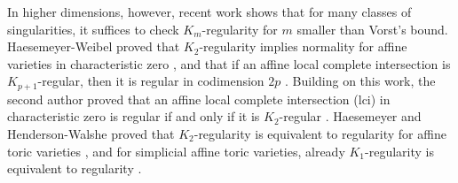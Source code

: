 \documentclass{amsart}
\newtheorem{conjecture}[conjecture]{Conjecture}
\theoremstyle{definition}
\newcommand{\matt}[1]{{\color{red}[[\ensuremath{\spadesuit\spadesuit\spadesuit} #1]]}}
\newcommand{\matt}[1]{}
\begin{document}



In higher dimensions, however, recent work shows that for many classes of singularities, it suffices to check $K_m$-regularity for $m$ smaller than Vorst's bound. Haesemeyer-Weibel proved that $K_2$-regularity implies normality for affine varieties in characteristic zero \cite[Theorem~0.1]{HaesemeyerWeibel}, and that if an affine local complete intersection is $K_{p+1}$-regular, then it is regular in codimension $2p$ \cite[Theorem~0.3]{HaesemeyerWeibel}. Building on this work, the second author proved that an affine local complete intersection (lci) in characteristic zero is regular if and only if it is $K_2$-regular \cite[Theorem~E]{Shen2025}. Haesemeyer and Henderson-Walshe proved that $K_2$-regularity is equivalent to regularity for affine toric varieties \cite[Theorems~1.1 and~1.2]{Haesemeyer2026}, and for simplicial affine toric varieties, already $K_1$-regularity is equivalent to regularity \cite[Theorem~1.1]{Haesemeyer2026}.
\end{document}
